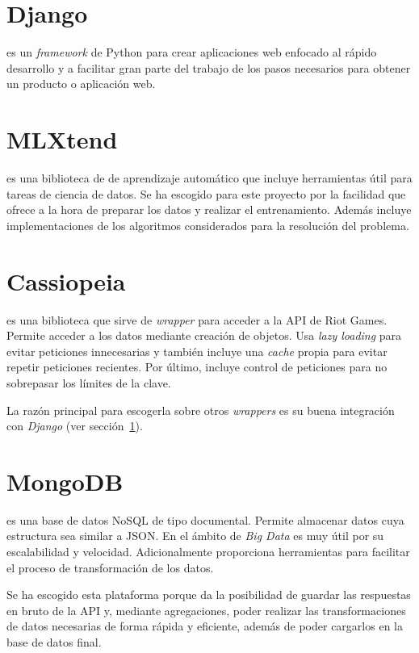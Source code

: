 \section{Django}\label{django}
 es un \textit{framework} de Python para crear aplicaciones web enfocado al rápido desarrollo y a facilitar gran parte del trabajo de los pasos necesarios para obtener un producto o aplicación web.

\section{MLXtend}
 es una biblioteca de de aprendizaje automático que incluye herramientas útil para tareas de ciencia de datos. Se ha escogido para este proyecto por la facilidad que ofrece a la hora de preparar los datos y realizar el entrenamiento. Además incluye implementaciones de los algoritmos considerados para la resolución del problema.

\section{Cassiopeia}
 es una biblioteca que sirve de \textit{wrapper} para acceder a la API de Riot Games. Permite acceder a los datos mediante creación de objetos. Usa \textit{lazy loading} para evitar peticiones innecesarias y también incluye una \textit{cache} propia para evitar repetir peticiones recientes. Por último, incluye control de peticiones para no sobrepasar los límites de la clave.

La razón principal para escogerla sobre otros \textit{wrappers} es su buena integración con \textit{Django} (ver sección~\ref{django}).

\section{MongoDB}
 es una base de datos NoSQL de tipo documental. Permite almacenar datos cuya estructura sea similar a JSON. En el ámbito de \textit{Big Data} es muy útil por su escalabilidad y velocidad. Adicionalmente proporciona herramientas para facilitar el proceso de transformación de los datos.

Se ha escogido esta plataforma porque da la posibilidad de guardar las respuestas en bruto de la API y, mediante agregaciones, poder realizar las transformaciones de datos necesarias de forma rápida y eficiente, además de poder cargarlos en la base de datos final.